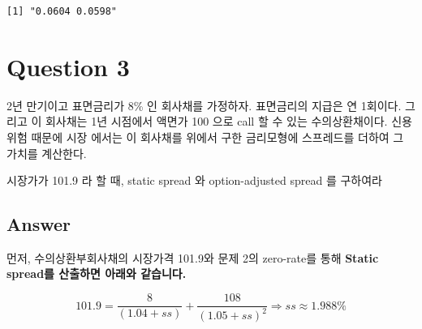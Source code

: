 \documentclass[
  letterpaper,
  DIV=11,
  numbers=noendperiod]{scrreprt}
\begin{document}
\begin{verbatim}
[1] "0.0604 0.0598"
\end{verbatim}

\section*{Question 3}\label{question-3}


2년 만기이고 표면금리가 8\% 인 회사채를 가정하자. 표면금리의 지급은 연
1회이다. 그리고 이 회사채는 1년 시점에서 액면가 100 으로 call 할 수 있는
수의상환채이다. 신용위험 때문에 시장 에서는 이 회사채를 위에서 구한
금리모형에 스프레드를 더하여 그 가치를 계산한다.

시장가가 101.9 라 할 때, static spread 와 option-adjusted spread 를
구하여라

\subsection*{Answer}\label{answer-2}

먼저, 수의상환부회사채의 시장가격 101.9와 문제 2의 zero-rate를 통해
\textbf{Static spread를 산출하면 아래와 같습니다.}

\[101.9=\frac{8}{(1.04+ss)}+\frac{108}{(1.05+ss)^2}\Rightarrow ss\approx 1.988\%\]
\end{document}
